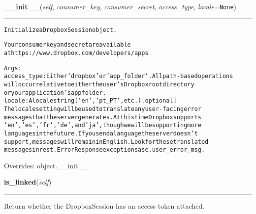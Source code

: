\hspace{.8\funcindent}\begin{boxedminipage}{\funcwidth}

    \raggedright \textbf{\_\_init\_\_}(\textit{self}, \textit{consumer\_key}, \textit{consumer\_secret}, \textit{access\_type}, \textit{locale}={\tt None})

    \vspace{-1.5ex}

    \rule{\textwidth}{0.5\fboxrule}
\setlength{\parskip}{2ex}
\begin{alltt}
Initialize a DropboxSession object.

Your consumer key and secret are available
at https://www.dropbox.com/developers/apps

Args:
    access\_type: Either 'dropbox' or 'app\_folder'. All path-based operations
        will occur relative to either the user's Dropbox root directory
        or your application's app folder.
    locale: A locale string ('en', 'pt\_PT', etc.) [optional]
        The locale setting will be used to translate any user-facing error
        messages that the server generates. At this time Dropbox supports
        'en', 'es', 'fr', 'de', and 'ja', though we will be supporting more
        languages in the future. If you send a language the server doesn't
        support, messages will remain in English. Look for these translated
        messages in rest.ErrorResponse exceptions as e.user\_error\_msg.
\end{alltt}

\setlength{\parskip}{1ex}
      Overrides: object.\_\_init\_\_

    \end{boxedminipage}

    \label{lib:dropbox:DropboxSession:is_linked}

    \vspace{0.5ex}

\hspace{.8\funcindent}\begin{boxedminipage}{\funcwidth}

    \raggedright \textbf{is\_linked}(\textit{self})

    \vspace{-1.5ex}

    \rule{\textwidth}{0.5\fboxrule}
\setlength{\parskip}{2ex}
    Return whether the DropboxSession has an access token attached.

\setlength{\parskip}{1ex}
    \end{boxedminipage}

